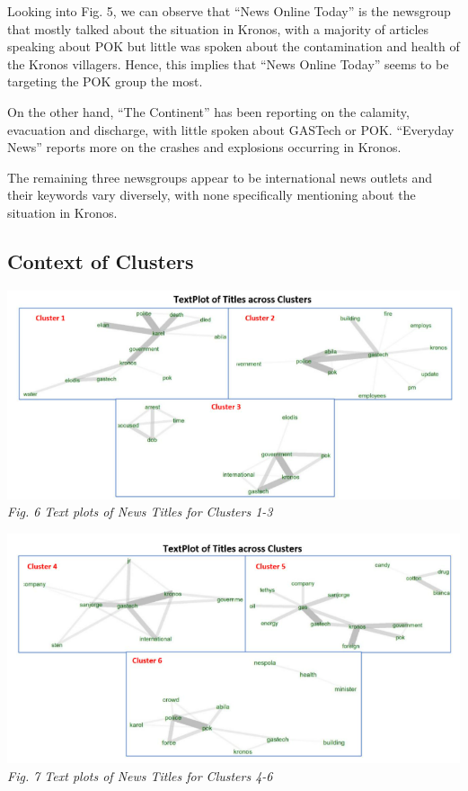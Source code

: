 \documentclass{acm_proc_article-sp}
\begin{document}
Looking into Fig. 5, we can observe that ``News Online Today'' is the
newsgroup that mostly talked about the situation in Kronos, with a
majority of articles speaking about POK but little was spoken about the
contamination and health of the Kronos villagers. Hence, this implies
that ``News Online Today'' seems to be targeting the POK group the most.

On the other hand, ``The Continent'' has been reporting on the calamity,
evacuation and discharge, with little spoken about GASTech or POK.
``Everyday News'' reports more on the crashes and explosions occurring
in Kronos.

The remaining three newsgroups appear to be international news outlets
and their keywords vary diversely, with none specifically mentioning
about the situation in Kronos.

\hypertarget{context-of-clusters}{%
\subsection{Context of Clusters}\label{context-of-clusters}}

\includegraphics{img/image12.png} \emph{Fig. 6 Text plots of News Titles
for Clusters 1-3}

\includegraphics{img/image13.png} \emph{Fig. 7 Text plots of News Titles
for Clusters 4-6}
\end{document}
